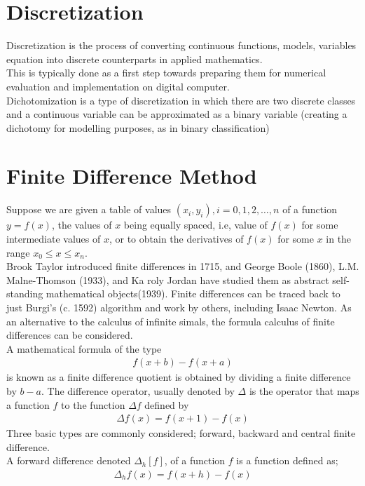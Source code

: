 \documentclass[11pt]{report}
\newcommand{\sps}{\\[0.2cm]}
\newcommand{\NI}{\noindent}
\begin{document}
	\section{Discretization}
	Discretization is the process of converting continuous functions, models, variables equation into discrete counterparts in applied mathematics.\sps
	This is typically done as a first step towards preparing them for numerical evaluation and implementation on digital computer.\sps
	Dichotomization is a type of discretization in which there are two discrete classes and a continuous variable can be approximated as a binary variable (creating a dichotomy for modelling purposes, as in binary classification)
	
	\section{Finite Difference Method}
	Suppose we are given a table of values $(x_i,y_i), i=0,1,2,\ldots,n$ of a function $y=f(x)$, the values of $x$ being equally spaced, i.e, value of $f(x)$ for some intermediate values of $x$, or to obtain the derivatives of $f(x)$ for some $x$ in the range $x_0 \leq x \leq x_n$.\sps
	Brook Taylor introduced finite differences in 1715, and George Boole (1860), L.M. Malne-Thomson (1933), and Ka roly Jordan have studied them as abstract self-standing mathematical objects(1939). Finite differences can be traced back to just Burgi's (c. 1592) algorithm and work by others, including Isaac Newton. As an alternative to the calculus of infinite simals, the formula calculus of finite differences can be considered.\sps
	A mathematical formula of the type
	\begin{eqnarray}
		f(x+b)-f(x+a)
	\end{eqnarray}
	is known as a finite difference quotient is obtained by dividing a finite difference by $b-a$. The difference operator, usually denoted by $\Delta $ is the operator that maps a function $f$ to the function $\Delta f$ defined by
	\begin{eqnarray}
		\Delta f(x) = f(x+1) - f(x)
	\end{eqnarray}
	Three basic types are commonly considered; forward, backward and central finite difference.\sps
	
	\NI A forward difference denoted $\Delta_h[f]$, of a function $f$ is a function defined as;
	\begin{eqnarray}
		\Delta_h f(x) = f(x+h)-f(x)
	\end{eqnarray}
	
\end{document}
